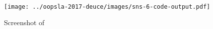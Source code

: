 \begin{figure}[t]
\begin{center}
\texttt{[image: ../oopsla-2017-deuce/images/sns-6-code-output.pdf]}
\end{center}
\caption{Screenshot of \sns{} \snsNewVersion{}}
\label{fig:sns-screenshot}
\end{figure}
